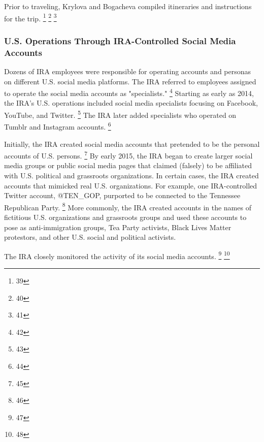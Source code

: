 Prior to traveling, Krylova and Bogacheva compiled itineraries and instructions for the trip.
\footnote{39}
\footnote{40}
\footnote{41}

\subsubsection{U.S. Operations Through IRA-Controlled Social Media Accounts}

Dozens of IRA employees were responsible for operating accounts and personas on different U.S. social media platforms.
The IRA referred to employees assigned to operate the social media accounts as "specialists."%
\footnote{42}
Starting as early as 2014, the IRA's U.S. operations included social media specialists focusing on Facebook, YouTube, and Twitter.%
\footnote{43}
The IRA later added specialists who operated on Tumblr and Instagram accounts.%
\footnote{44}

Initially, the IRA created social media accounts that pretended to be the personal accounts of U.S. persons.%
\footnote{45}
By early 2015, the IRA began to create larger social media groups or public social media pages that claimed (falsely) to be affiliated with U.S. political and grassroots organizations.
In certain cases, the IRA created accounts that mimicked real U.S. organizations.
For example, one IRA-controlled Twitter account, @TEN\_GOP, purported to be connected to the Tennessee Republican Party.%
\footnote{46}
More commonly, the IRA created accounts in the names of fictitious U.S. organizations and grassroots groups and used these accounts to pose as anti-immigration groups, Tea Party activists, Black Lives Matter protestors, and other U.S. social and political activists.

The IRA closely monitored the activity of its social media accounts.
\footnote{47}
\footnote{48}

